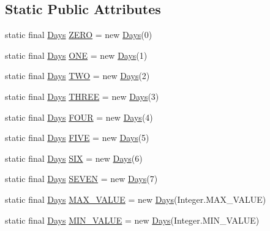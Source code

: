 \subsection*{Static Public Attributes}
\begin{DoxyCompactItemize}
\item 
static final \hyperlink{classorg_1_1joda_1_1time_1_1_days}{Days} \hyperlink{classorg_1_1joda_1_1time_1_1_days_a04717d60c37fa7a4c17e3423a4c19ea2}{Z\-E\-R\-O} = new \hyperlink{classorg_1_1joda_1_1time_1_1_days}{Days}(0)
\item 
static final \hyperlink{classorg_1_1joda_1_1time_1_1_days}{Days} \hyperlink{classorg_1_1joda_1_1time_1_1_days_a062886b8436863becff5245ad7d9a810}{O\-N\-E} = new \hyperlink{classorg_1_1joda_1_1time_1_1_days}{Days}(1)
\item 
static final \hyperlink{classorg_1_1joda_1_1time_1_1_days}{Days} \hyperlink{classorg_1_1joda_1_1time_1_1_days_a85081cb00a2b29440d8b8d62b6b3cc66}{T\-W\-O} = new \hyperlink{classorg_1_1joda_1_1time_1_1_days}{Days}(2)
\item 
static final \hyperlink{classorg_1_1joda_1_1time_1_1_days}{Days} \hyperlink{classorg_1_1joda_1_1time_1_1_days_ad769bba946770cb004529ae1c2ccaaa8}{T\-H\-R\-E\-E} = new \hyperlink{classorg_1_1joda_1_1time_1_1_days}{Days}(3)
\item 
static final \hyperlink{classorg_1_1joda_1_1time_1_1_days}{Days} \hyperlink{classorg_1_1joda_1_1time_1_1_days_ad3ed74196b15442dfa553a18dbcf7c73}{F\-O\-U\-R} = new \hyperlink{classorg_1_1joda_1_1time_1_1_days}{Days}(4)
\item 
static final \hyperlink{classorg_1_1joda_1_1time_1_1_days}{Days} \hyperlink{classorg_1_1joda_1_1time_1_1_days_a8bb594be5513ec6ae35efa0cee35c5ca}{F\-I\-V\-E} = new \hyperlink{classorg_1_1joda_1_1time_1_1_days}{Days}(5)
\item 
static final \hyperlink{classorg_1_1joda_1_1time_1_1_days}{Days} \hyperlink{classorg_1_1joda_1_1time_1_1_days_ae5aced74fc2850cdbe99fa7e0f0ce039}{S\-I\-X} = new \hyperlink{classorg_1_1joda_1_1time_1_1_days}{Days}(6)
\item 
static final \hyperlink{classorg_1_1joda_1_1time_1_1_days}{Days} \hyperlink{classorg_1_1joda_1_1time_1_1_days_a593d447711a3960100e09d3a45148923}{S\-E\-V\-E\-N} = new \hyperlink{classorg_1_1joda_1_1time_1_1_days}{Days}(7)
\item 
static final \hyperlink{classorg_1_1joda_1_1time_1_1_days}{Days} \hyperlink{classorg_1_1joda_1_1time_1_1_days_ac6c1d4741e6e3b4d8a188833321f7f8d}{M\-A\-X\-\_\-\-V\-A\-L\-U\-E} = new \hyperlink{classorg_1_1joda_1_1time_1_1_days}{Days}(Integer.\-M\-A\-X\-\_\-\-V\-A\-L\-U\-E)
\item 
static final \hyperlink{classorg_1_1joda_1_1time_1_1_days}{Days} \hyperlink{classorg_1_1joda_1_1time_1_1_days_a4b97ba30b49f964a0991285a11a38998}{M\-I\-N\-\_\-\-V\-A\-L\-U\-E} = new \hyperlink{classorg_1_1joda_1_1time_1_1_days}{Days}(Integer.\-M\-I\-N\-\_\-\-V\-A\-L\-U\-E)
\end{DoxyCompactItemize}
